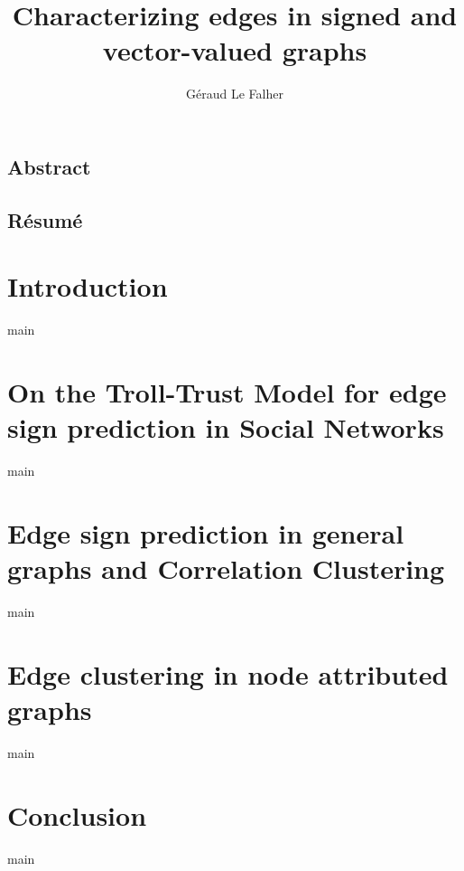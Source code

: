 \documentclass[a4paper,svgnames,twoside,onecolumn,final,titlepage,11pt]{book}
\title{Characterizing edges in signed and vector-valued graphs}
\author{Géraud Le Falher}
\begin{document}

\maketitle
\frontmatter

\section*{Abstract}


\begin{otherlanguage}{french}
  \section*{Résumé}
  
\end{otherlanguage}

\tableofcontents
\listoffigures
\listoftables
\newpage



\mainmatter
\pagestyle{fancy}

\chapter{Introduction}
{main}

\chapter{On the Troll-Trust Model for edge sign prediction in Social Networks}
{main}

\chapter{Edge sign prediction in general graphs and Correlation Clustering}
{main}

\chapter{Edge clustering in node attributed graphs}
{main}

\chapter{Conclusion}
{main}

\backmatter
\vspace{\baselineskip}
\begingroup
{}
\setlength\bibitemsep{1pt}
\printbibliography
\restoregeometry
\endgroup
\end{document}
